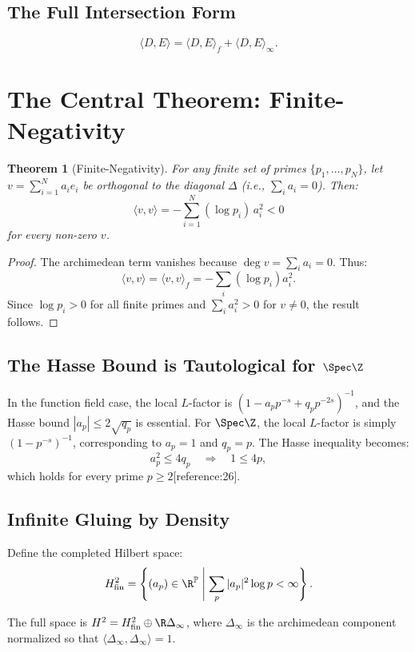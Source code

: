 \documentclass[11pt,a4paper]{article}
\newtheorem{theorem}{Theorem}[section]
\begin{document}
\subsection{The Full Intersection Form}

\[
\langle D, E \rangle = \langle D, E \rangle_f + \langle D, E \rangle_\infty.
\]

\section{The Central Theorem: Finite-Negativity}

\begin{theorem}[Finite-Negativity]
For any finite set of primes $\{p_1, \dots, p_N\}$, let $v = \sum_{i=1}^N a_i e_i$ be orthogonal to the diagonal $\Delta$ (i.e., $\sum_i a_i = 0$). Then:
\[
\langle v, v \rangle = -\sum_{i=1}^N (\log p_i) \, a_i^2 < 0
\]
for every non-zero $v$.
\end{theorem}

\begin{proof}
The archimedean term vanishes because $\deg v = \sum_i a_i = 0$. Thus:
\[
\langle v, v \rangle = \langle v, v \rangle_f = -\sum_i (\log p_i) a_i^2.
\]
Since $\log p_i > 0$ for all finite primes and $\sum_i a_i^2 > 0$ for $v \neq 0$, the result follows.
\end{proof}

\subsection{The Hasse Bound is Tautological for $\Spec \Z$}

In the function field case, the local $L$-factor is $(1 - a_p p^{-s} + q_p p^{-2s})^{-1}$, and the Hasse bound $|a_p| \le 2\sqrt{q_p}$ is essential. For $\Spec \Z$, the local $L$-factor is simply $(1 - p^{-s})^{-1}$, corresponding to $a_p = 1$ and $q_p = p$. The Hasse inequality becomes:
\[
a_p^2 \le 4q_p \quad \Longrightarrow \quad 1 \le 4p,
\]
which holds for every prime $p \ge 2$[reference:26].

\subsection{Infinite Gluing by Density}

Define the completed Hilbert space:
\[
H^2_{\text{fin}} = \left\{ (a_p) \in \R^{\mathbb{P}} \;\middle|\; \sum_{p} |a_p|^2 \log p < \infty \right\}.
\]

The full space is $H^2 = H^2_{\text{fin}} \oplus \R \Delta_\infty$, where $\Delta_\infty$ is the archimedean component normalized so that $\langle \Delta_\infty, \Delta_\infty \rangle = 1$.
\end{document}
